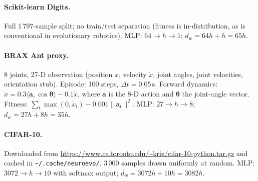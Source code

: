 \documentclass{article}
\begin{document}
\paragraph{Scikit-learn Digits.}
Full 1\,797-sample split; no train/test separation (fitness is
in-distribution, as is conventional in evolutionary robotics).
MLP: $64 \to h \to 1$; $d_w = 64h + h = 65h$.

\paragraph{BRAX Ant proxy.}
8 joints, 27-D observation (position $x$, velocity $\dot{x}$, joint angles,
joint velocities, orientation stub).
Episode: 100 steps, $\Delta t = 0.05$\,s.
Forward dynamics: $\ddot{x} = 0.3\langle\mathbf{a},\cos\boldsymbol{\theta}\rangle
- 0.1\dot{x}$, where $\mathbf{a}$ is the 8-D action and $\boldsymbol{\theta}$
the joint-angle vector.
Fitness: $\sum_t \max(0, \dot{x}_t) - 0.001\|\mathbf{a}_t\|^2$.
MLP: $27 \to h \to 8$; $d_w = 27h + 8h = 35h$.

\paragraph{CIFAR-10.}
Downloaded from \url{https://www.cs.toronto.edu/~kriz/cifar-10-python.tar.gz}
and cached in \texttt{\textasciitilde/.cache/neuroevo/}.
3\,000 samples drawn uniformly at random.
MLP: $3072 \to h \to 10$ with softmax output; $d_w = 3072h + 10h = 3082h$.


\newpage

\end{document}
